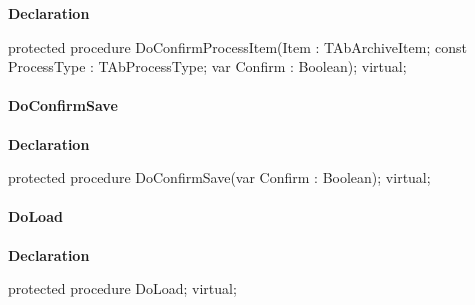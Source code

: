 \documentclass{report}
\newif\ifpdf
\begin{document}
\label{AbArcTyp.TAbArchive-DoConfirmProcessItem}
\begin{list}{}{
\setlength{\itemindent}{0cm}
\setlength{\listparindent}{0cm}
\setlength{\leftmargin}{\evensidemargin}
\addtolength{\leftmargin}{\tmplength}
\settowidth{\labelsep}{X}
\addtolength{\leftmargin}{\labelsep}
\setlength{\labelwidth}{\tmplength}
}
\item[\textbf{Declaration}\hfill]
\ifpdf
\begin{flushleft}
\fi
\begin{ttfamily}
protected procedure DoConfirmProcessItem(Item : TAbArchiveItem; const ProcessType : TAbProcessType; var Confirm : Boolean); virtual;\end{ttfamily}

\ifpdf
\end{flushleft}
\fi

\end{list}
\paragraph*{DoConfirmSave}\hspace*{\fill}

\label{AbArcTyp.TAbArchive-DoConfirmSave}
\begin{list}{}{
\setlength{\itemindent}{0cm}
\setlength{\listparindent}{0cm}
\setlength{\leftmargin}{\evensidemargin}
\addtolength{\leftmargin}{\tmplength}
\settowidth{\labelsep}{X}
\addtolength{\leftmargin}{\labelsep}
\setlength{\labelwidth}{\tmplength}
}
\item[\textbf{Declaration}\hfill]
\ifpdf
\begin{flushleft}
\fi
\begin{ttfamily}
protected procedure DoConfirmSave(var Confirm : Boolean); virtual;\end{ttfamily}

\ifpdf
\end{flushleft}
\fi

\end{list}
\paragraph*{DoLoad}\hspace*{\fill}

\label{AbArcTyp.TAbArchive-DoLoad}
\begin{list}{}{
\setlength{\itemindent}{0cm}
\setlength{\listparindent}{0cm}
\setlength{\leftmargin}{\evensidemargin}
\addtolength{\leftmargin}{\tmplength}
\settowidth{\labelsep}{X}
\addtolength{\leftmargin}{\labelsep}
\setlength{\labelwidth}{\tmplength}
}
\item[\textbf{Declaration}\hfill]
\ifpdf
\begin{flushleft}
\fi
\begin{ttfamily}
protected procedure DoLoad; virtual;\end{ttfamily}

\ifpdf
\end{flushleft}
\fi

\end{list}
\end{document}
